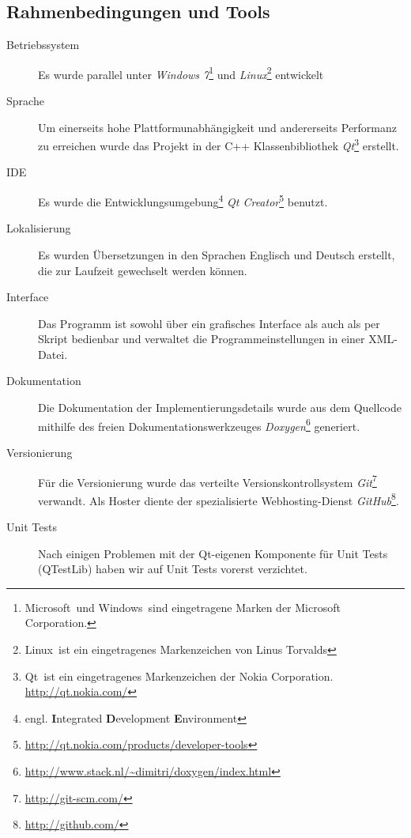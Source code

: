 \documentclass[	a4paper,		%
		titlepage, 		%
		fontsize=12pt		%
		]{scrartcl} 		%
\begin{document}
\subsection{Rahmenbedingungen und Tools}
\begin{description}
 \item[Betriebssystem]
 Es wurde parallel unter \emph{Windows 7}\footnote{Microsoft\textregistered ~und Windows\textregistered ~sind eingetragene Marken der Microsoft Corporation.} und \emph{Linux}\footnote{Linux\textregistered ~ist ein eingetragenes Markenzeichen von Linus Torvalds} entwickelt

 \item[Sprache]
Um einerseits hohe Plattformunabhängigkeit und andererseits Performanz zu erreichen wurde das Projekt in der C++ Klassenbibliothek \emph{Qt}\footnote{Qt\textregistered ~ist ein eingetragenes Markenzeichen der Nokia Corporation. \href{http://qt.nokia.com/}{http://qt.nokia.com/}} erstellt.

 \item[IDE]
Es wurde die Entwicklungsumgebung\footnote{engl. \textbf{I}ntegrated \textbf{D}evelopment \textbf{E}nvironment} \emph{Qt Creator}\footnote{\href{http://qt.nokia.com/products/developer-tools}{http://qt.nokia.com/products/developer-tools}} benutzt.

 \item[Lokalisierung]
Es wurden Übersetzungen in den Sprachen Englisch und Deutsch erstellt, die zur Laufzeit gewechselt werden können.

 \item[Interface]
Das Programm ist sowohl über ein grafisches Interface als auch als per Skript bedienbar und verwaltet die Programmeinstellungen in einer XML-Datei.

 \item[Dokumentation]
Die Dokumentation der Implementierungsdetails wurde aus dem Quellcode mithilfe des freien Dokumentationswerkzeuges \emph{Doxygen}\footnote{\href{http://www.stack.nl/~dimitri/doxygen/index.html}{http://www.stack.nl/\textasciitilde dimitri/doxygen/index.html}} generiert.

 \item[Versionierung]
Für die Versionierung wurde das verteilte Versionskontrollsystem \emph{Git}\footnote{\href{http://git-scm.com/}{http://git-scm.com/}} verwandt. Als Hoster diente der spezialisierte Webhosting-Dienst \emph{GitHub}\footnote{\href{http://github.com/}{http://github.com/}}.

\item[Unit Tests]
Nach einigen Problemen mit der Qt-eigenen Komponente für Unit Tests (QTestLib) haben wir auf Unit Tests vorerst verzichtet.


\end{description}
\end{document}

